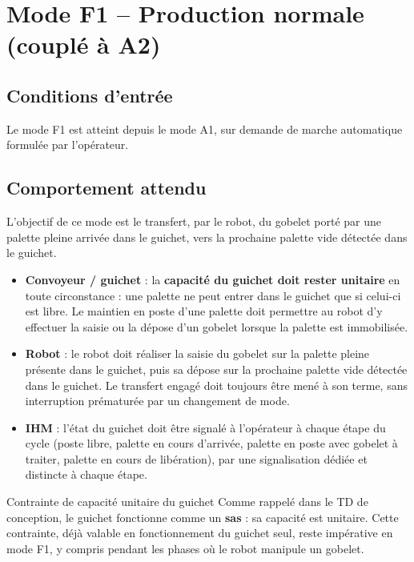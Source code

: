 \section{Mode F1 -- Production normale (couplé à A2)}
\label{secModeF1}

\subsection{Conditions d'entrée}

Le mode F1 est atteint depuis le mode A1, sur demande de marche automatique
formulée par l'opérateur.

\subsection{Comportement attendu}

L'objectif de ce mode est le transfert, par le robot, du gobelet porté par
une palette pleine arrivée dans le guichet, vers la prochaine palette vide
détectée dans le guichet.

\begin{itemize}
    \item \textbf{Convoyeur / guichet} : la \textbf{capacité du guichet
    doit rester unitaire} en toute circonstance : une palette ne peut
    entrer dans le guichet que si celui-ci est libre. Le maintien en poste
    d'une palette doit permettre au robot d'y effectuer la saisie ou la
    dépose d'un gobelet lorsque la palette est immobilisée.
    \item \textbf{Robot} : le robot doit réaliser la saisie du gobelet sur
    la palette pleine présente dans le guichet, puis sa dépose sur la
    prochaine palette vide détectée dans le guichet. Le transfert engagé
    doit toujours être mené à son terme, sans interruption prématurée par
    un changement de mode.
    \item \textbf{IHM} : l'état du guichet doit être signalé à l'opérateur
    à chaque étape du cycle (poste libre, palette en cours d'arrivée,
    palette en poste avec gobelet à traiter, palette en cours de
    libération), par une signalisation dédiée et distincte à chaque étape.
\end{itemize}

\begin{UPSTIwarning}{Contrainte de capacité unitaire du guichet}
Comme rappelé dans le TD de conception, le guichet fonctionne comme un
\textbf{sas} : sa capacité est unitaire. Cette contrainte, déjà valable en
fonctionnement du guichet seul, reste impérative en mode F1, y compris
pendant les phases où le robot manipule un gobelet.
\end{UPSTIwarning}

